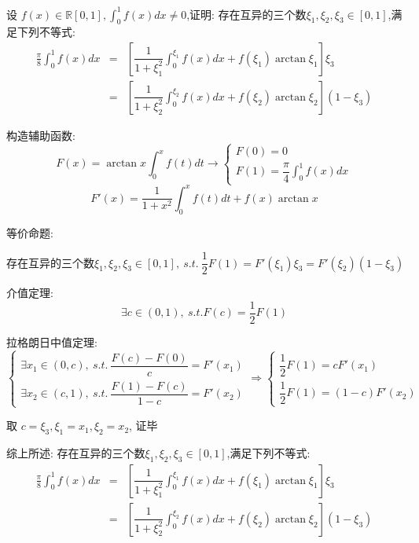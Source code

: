 \begin{proposition}
	设 $f(x)\in \mathbb{R}[0,1],\displaystyle{\int_{0}^{1}f(x)dx}\neq 0$,证明: 存在互异的三个数$\xi_{1},\xi_{2},\xi_{3}\in[0,1]$,满足下列不等式:
	\begin{eqnarray*}
		\frac{\pi}{8}\int_{0}^{1}f(x)dx & = & \left[\dfrac{1}{1+\xi_{1}^2}\int_{0}^{\xi_{1}}f(x)dx+f(\xi_{1})\arctan\xi_{1}\right]\xi_{3}\\
		                                & = & \left[\dfrac{1}{1+\xi_{2}^2}\int_{0}^{\xi_{2}}f(x)dx+f(\xi_{2})\arctan\xi_{2}\right](1-\xi_{3})
	\end{eqnarray*}
\end{proposition}
\begin{solution}

	构造辅助函数:
	$$F(x) = \displaystyle{\arctan x\int_{0}^{x}f(t)dt}\to 
	\begin{cases}
		F(0)=0\\
		\displaystyle{F(1)=\dfrac{\pi}{4}\int_{0}^{1}f(x)dx}
	\end{cases}$$ 
	$$F'(x)=\dfrac{1}{1+x^2}\int_{0}^{x}f(t)dt+f(x)\arctan x$$

	等价命题:

	$$\text{存在互异的三个数} \xi_{1},\xi_{2},\xi_{3}\in[0,1],\ s.t.\ \dfrac{1}{2}F(1) = F'(\xi_{1})\xi_{3} = F'(\xi_{2})(1-\xi_{3})$$

	介值定理:
	$$\exists c\in (0,1),\ s.t. F(c) = \dfrac{1}{2}F(1)$$

	拉格朗日中值定理:
	$$\begin{cases}
		\exists x_{1}\in(0,c),\ s.t.\ \dfrac{F(c)-F(0)}{c}=F'(x_{1}) \\
		\exists x_{2}\in(c,1),\ s.t.\ \dfrac{F(1)-F(c)}{1-c}=F'(x_{2})
	\end{cases}\Rightarrow
	\begin{cases}
		\dfrac{1}{2}F(1) = cF'(x_{1})\\
		\dfrac{1}{2}F(1) = (1-c)F'(x_{2})
	\end{cases}$$

	取 $c = \xi_{3}, \xi_{1} = x_{1}, \xi_{2} = x_{2}$, 证毕

	综上所述: 存在互异的三个数$\xi_{1},\xi_{2},\xi_{3}\in[0,1]$,满足下列不等式:
	\begin{eqnarray*}
		\frac{\pi}{8}\int_{0}^{1}f(x)dx & = & \left[\dfrac{1}{1+\xi_{1}^2}\int_{0}^{\xi_{1}}f(x)dx+f(\xi_{1})\arctan\xi_{1}\right]\xi_{3}\\
										& = & \left[\dfrac{1}{1+\xi_{2}^2}\int_{0}^{\xi_{2}}f(x)dx+f(\xi_{2})\arctan\xi_{2}\right](1-\xi_{3})
	\end{eqnarray*}
\end{solution}

